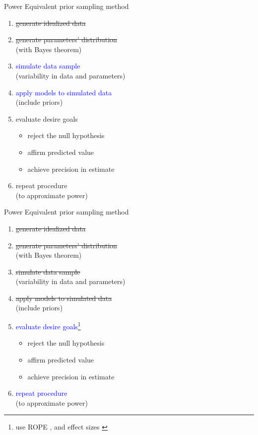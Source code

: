 %
%
\begin{lhframe}[rhgraphic={\texttt{[image: power\_function.png]}}]
	{Power}
	{Equivalent prior sampling method} 
	\begin{enumerate}
		\item \sout{generate idealized data}
		\item \sout{generate parameters' distribution} \\
		\small{(with Bayes theorem)}
		\item \textcolor{blue}{simulate data sample} \\
		\small{ (variability in data and parameters) }
		\item \textcolor{blue}{apply models to simulated data} \\
		\small{ (include priors) }
		\item evaluate desire goals
		\begin{itemize}
			\item reject the null hypothesis
			\item affirm predicted value
			\item achieve precision in estimate
		\end{itemize}
		\item repeat procedure \\
		\small{ (to approximate power) }
	\end{enumerate}
\end{lhframe}
%
%
\begin{lhframe}[rhgraphic={\texttt{[image: ES\_ROPE.png]}}]
	{Power}
	{Equivalent prior sampling method} 
	\begin{enumerate}
		\item \sout{generate idealized data}
		\item \sout{generate parameters' distribution} \\
		\small{(with Bayes theorem)}
		\item \sout{simulate data sample} \\
		\small{(variability in data and parameters)}
		\item \sout{apply models to simulated data} \\
		\small{(include priors)}
		\item \textcolor{blue}{evaluate desire goals}\footnote{use ROPE \cite{Kruschke_2014}, and effect sizes \cite{Cohen_1988, Sawilowsky_2009}}
		\begin{itemize}
			\item reject the null hypothesis
			\item affirm predicted value
			\item achieve precision in estimate
		\end{itemize}
		\item \textcolor{blue}{repeat procedure} \\
		\small{ (to approximate power) }
	\end{enumerate}
\end{lhframe}
